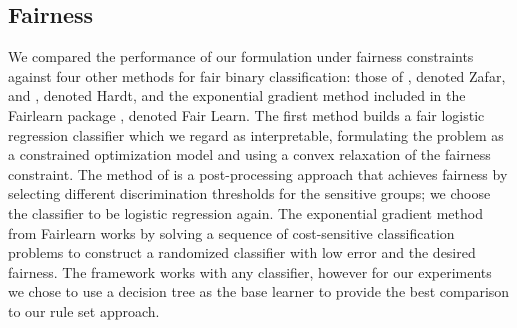 \documentclass[twoside,11pt]{article}
\begin{document}
\subsection{Fairness}\label{sec:expFair}
    We compared the performance of our formulation under fairness constraints against four other methods for fair binary classification: those of \cite{Zafar_2017}, denoted Zafar, and \cite{hardt2016equality}, denoted Hardt, and the exponential gradient method included in the Fairlearn package \citep{agarwal2018reductions}, denoted Fair Learn. The first method builds a fair logistic regression classifier which we regard as interpretable, formulating %
    the problem as a constrained optimization model and using a convex relaxation of the fairness constraint. The method of \cite{hardt2016equality} is a post-processing approach that %
    achieves fairness by selecting different discrimination thresholds for the sensitive groups; we choose the classifier to be logistic regression again. The exponential gradient method from Fairlearn works by solving a sequence of cost-sensitive classification problems to construct a randomized classifier with low error and the desired fairness. The framework works with any classifier, however for our experiments we chose to use a decision tree as the base learner to provide the best comparison to our rule set approach.  
    
   
\end{document}
